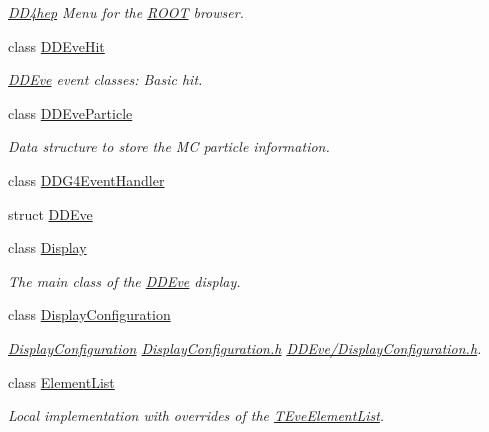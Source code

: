 \begin{DoxyCompactItemize}
\begin{DoxyCompactList}\small\item\em \hyperlink{namespace_d_d4hep}{DD4hep} Menu for the \hyperlink{namespace_r_o_o_t}{ROOT} browser. \item\end{DoxyCompactList}\item 
class \hyperlink{class_d_d4hep_1_1_d_d_eve_hit}{DDEveHit}
\begin{DoxyCompactList}\small\item\em \hyperlink{struct_d_d4hep_1_1_d_d_eve}{DDEve} event classes: Basic hit. \item\end{DoxyCompactList}\item 
class \hyperlink{class_d_d4hep_1_1_d_d_eve_particle}{DDEveParticle}
\begin{DoxyCompactList}\small\item\em Data structure to store the MC particle information. \item\end{DoxyCompactList}\item 
class \hyperlink{class_d_d4hep_1_1_d_d_g4_event_handler}{DDG4EventHandler}
\item 
struct \hyperlink{struct_d_d4hep_1_1_d_d_eve}{DDEve}
\item 
class \hyperlink{class_d_d4hep_1_1_display}{Display}
\begin{DoxyCompactList}\small\item\em The main class of the \hyperlink{struct_d_d4hep_1_1_d_d_eve}{DDEve} display. \item\end{DoxyCompactList}\item 
class \hyperlink{class_d_d4hep_1_1_display_configuration}{DisplayConfiguration}
\begin{DoxyCompactList}\small\item\em \hyperlink{class_d_d4hep_1_1_display_configuration}{DisplayConfiguration} \hyperlink{_display_configuration_8h}{DisplayConfiguration.h} \hyperlink{_display_configuration_8h}{DDEve/DisplayConfiguration.h}. \item\end{DoxyCompactList}\item 
class \hyperlink{class_d_d4hep_1_1_element_list}{ElementList}
\begin{DoxyCompactList}\small\item\em Local implementation with overrides of the \hyperlink{class_t_eve_element_list}{TEveElementList}. \item\end{DoxyCompactList}\item 

\end{DoxyCompactItemize}
